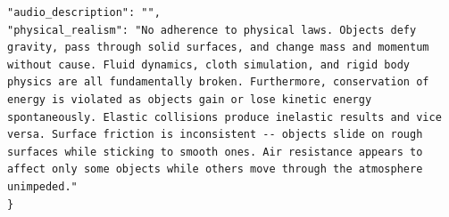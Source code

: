 \begin{tcolorbox}
\begin{Verbatim}[breaklines=true,breakanywhere=true,fontsize=\scriptsize]
"audio_description": "",
"physical_realism": "No adherence to physical laws. Objects defy gravity, pass through solid surfaces, and change mass and momentum without cause. Fluid dynamics, cloth simulation, and rigid body physics are all fundamentally broken. Furthermore, conservation of energy is violated as objects gain or lose kinetic energy spontaneously. Elastic collisions produce inelastic results and vice versa. Surface friction is inconsistent -- objects slide on rough surfaces while sticking to smooth ones. Air resistance appears to affect only some objects while others move through the atmosphere unimpeded."
}
\end{Verbatim}
\end{tcolorbox}
